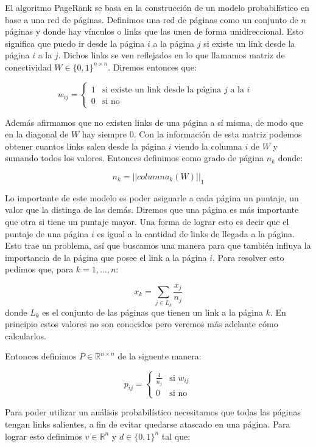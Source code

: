 El algoritmo PageRank se basa en la construcci\'on de un modelo probabil\'istico en base a una red de p\'aginas. Definimos una red de p\'aginas como un conjunto de $n$ p\'aginas y donde hay v\'inculos o links que las unen de forma unidireccional. Esto significa que puedo ir desde la p\'agina $i$ a la p\'agina $j$ si existe un link desde la p\'agina $i$ a la $j$. Dichos links se ven reflejados en lo que llamamos matriz de conectividad $W \in \{0,1\}^{n\times n}$. Diremos entonces que:

\[ w_{ij} =
\begin{cases}
	1 & \text{si existe un link desde la p\'agina $j$ a la $i$ }\\
	0 & \text{si no}
\end{cases}
\]

Adem\'as afirmamos que no existen links de una p\'agina a s\'i misma, de modo que en la diagonal de $W$ hay siempre 0. Con la informaci\'on de esta matriz podemos obtener cuantos links salen desde la p\'agina $i$ viendo la columna $i$ de $W$ y sumando todos los valores. Entonces definimos como grado de p\'agina $n_{k}$  donde:

\[ n_{k} = ||columna_{k}(W)||_{1}\]

Lo importante de este modelo es poder asignarle a cada p\'agina un puntaje, un valor que la distinga de las dem\'as. Diremos que una p\'agina es m\'as importante que otra si tiene un puntaje mayor. Una forma de lograr esto es decir que el puntaje de una p\'agina $i$ es igual a la cantidad de links de llegada a la p\'agina. Esto trae un problema, as\'i que buscamos una manera para que tambi\'en influya la importancia de la p\'agina que posee el link a la p\'agina $i$. Para resolver esto pedimos que, para $k = 1,...,n$:


\[ x_{k} = \sum_{j\in L_{k}}\frac{x_{j}}{n_{j}} \] donde $L_{k}$ es el conjunto de las p\'aginas que tienen un link a la p\'agina $k$. En principio estos valores no son conocidos pero veremos m\'as adelante c\'omo calcularlos.

Entonces definimos $P \in \mathbb{R}^{n\times n}$ de la siguente manera:

\[ p_{ij} =
\begin{cases}
	\frac{1}{n_{j}} & \text{si } w_{ij}\\
	0 & \text{si no}
\end{cases}
\]

Para poder utilizar un an\'alisis probabil\'istico necesitamos que todas las p\'aginas tengan links salientes, a fin de evitar quedarse atascado en una p\'agina. Para lograr esto definimos $v \in \mathbb{R}^{n}$ y $d \in \{0,1\}^{n}$ tal que:

